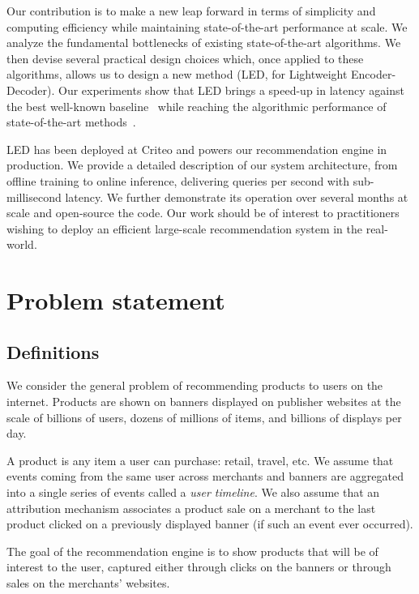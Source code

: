 \documentclass[sigconf]{acmart}
\begin{document}
Our contribution is to make a new leap forward in terms of simplicity and computing efficiency while maintaining state-of-the-art performance at scale. We analyze the fundamental bottlenecks of existing state-of-the-art algorithms. We then devise several practical design choices which, once applied to these algorithms, allows us to design a new method (LED, for Lightweight Encoder-Decoder). Our experiments show that LED brings a  speed-up in latency against the best well-known baseline~\cite{pixie-pinterest-www-2018} while reaching the algorithmic performance of state-of-the-art methods~\cite{variational-liang-2018}.

LED has been deployed at Criteo and powers our recommendation engine in production. We provide a detailed description of our system architecture, from offline training to online inference, delivering  queries per second with sub-millisecond latency. We further demonstrate its operation over several months at scale and open-source the code. Our work should  be of interest to practitioners wishing to deploy an efficient large-scale recommendation system in the real-world.

\section{Problem statement}

\subsection{Definitions}

We consider the general problem of recommending products to users on the internet. Products are shown on banners displayed on publisher websites at the scale of billions of users, dozens of millions of items, and billions of displays per day. 



A product is any item a user can purchase: retail, travel, etc. We assume that events coming from the same user across merchants and banners are aggregated into a single series of events called a {\it user timeline}. We also assume that an attribution mechanism associates a product sale on a merchant to the last product clicked on a previously displayed banner (if such an event ever occurred).

The goal of the recommendation engine is to show products that will be of interest to the user, captured either through clicks on the banners or through sales on the merchants' websites. 
 
\end{document}
